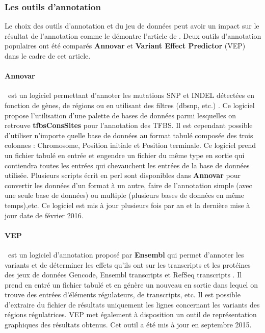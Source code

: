 \subsubsection{Les outils d'annotation}

Le choix des outils d'annotation et du jeu de données peut avoir un impact sur le résultat de l'annotation comme le démontre l'article de \citet{annot}. Deux outils d'annotation populaires ont été comparés \textbf{Annovar} et  \textbf{Variant Effect Predictor} (VEP) dans le cadre de cet article.

\paragraph{Annovar} ~est un logiciel permettant d'annoter les mutations SNP et INDEL détectées en fonction de gènes, de régions ou en utilisant des filtres (dbsnp, etc.) \citep{Annovar}. Ce logiciel propose l'utilisation d'une palette de bases de données parmi lesquelles on retrouve \textbf{tfbsConsSites} pour l'annotation des TFBS. Il est cependant possible d'utiliser n'importe quelle base de données au format tabulé composée des trois  colonnes : Chromosome, Position initiale et  Position terminale. Ce logiciel prend un fichier tabulé en entrée et engendre un fichier du même type en sortie qui contiendra toutes les entrées qui chevauchent les entrées de la base de données utilisée. Plusieurs scripts écrit en perl sont disponibles dans \textbf{Annovar} pour convertir les données d'un format à un autre, faire de l'annotation simple (avec une seule base de données) ou multiple (plusieurs bases de données en même temps),etc. Ce logiciel est mis à jour plusieurs fois par an et la dernière mise à jour date de février 2016.

\paragraph{VEP} ~est un logiciel d'annotation proposé par \textbf{Ensembl} \citep{ensembl} qui permet d'annoter les variants et de déterminer les effets qu'ils ont sur les transcripts et les protéines des jeux de données Gencode, Ensembl transcripts et RefSeq transcripts \citep{Refseq}. Il prend en entré un fichier tabulé et en génère un nouveau en sortie dans lequel on trouve des entrées d'éléments régulateurs, de transcripts, etc. Il est possible d'extraire du fichier de résultats uniquement les lignes concernant les variants des régions régulatrices. VEP met également à disposition un outil de représentation graphiques des résultats obtenus. Cet outil a été mis à jour en septembre 2015.

